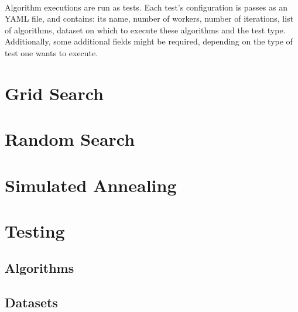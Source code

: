 \paragraph{}Algorithm executions are run as tests. Each test's configuration is passes as an YAML file, and contains: its name, number of workers, number of iterations, list of algorithms, dataset on which to execute these algorithms and the test type. Additionally, some additional fields might be required, depending on the type of test one wants to execute.



\section{Grid Search}

\section{Random Search}

\section{Simulated Annealing}

\section{Testing}

\subsection{Algorithms}

\subsection{Datasets}